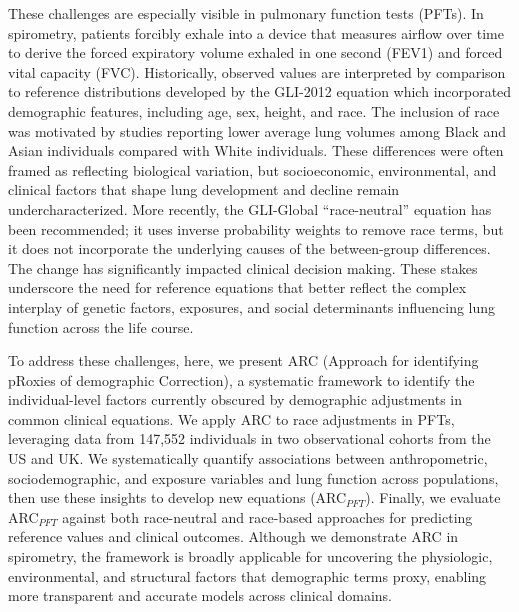 \documentclass[10pt]{extarticle}
\begin{document}
These challenges are especially visible in pulmonary function tests (PFTs). In spirometry, patients forcibly exhale into a device that measures airflow over time to derive the forced expiratory volume exhaled in one second (FEV1) and forced vital capacity (FVC). Historically, observed values are interpreted by comparison to reference distributions developed by the GLI-2012 equation which incorporated demographic features, including age, sex, height, and race\cite{Hankinson1999-qt,Quanjer2012-qw,Pellegrino2005-pq,Baugh2022-fs,Kanj2024-te,Choi2025-cl}. The inclusion of race was motivated by studies reporting lower average lung volumes among Black and Asian individuals compared with White individuals\cite{Hankinson1999-qt,Quanjer2012-qw,Kanj2024-te}. These differences were often framed as reflecting biological variation, but socioeconomic, environmental, and clinical factors that shape lung development and decline remain undercharacterized. More recently, the GLI-Global ``race-neutral'' equation has been recommended; it uses inverse probability weights to remove race terms, but it does not incorporate the underlying causes of the between-group differences\cite{Kanj2024-te,Choi2025-cl,Bowerman2023-ff,Moffett2023-eq}. The change has significantly impacted clinical decision making\cite{Diao2024-lw,Choi2025-cl,Moffett2023-eq}. These stakes underscore the need for reference equations that better reflect the complex interplay of genetic factors, exposures, and social determinants influencing lung function across the life course\cite{Menezes2015-ea,Holland2022-nt,Harik-Khan2001-bp,Whitrow2008-hm,He2023-bz,Manrai2017-fp,Patel2015-kc,Melen2024-ak,Lange2015-gb}.

To address these challenges, here, we present ARC (Approach for identifying pRoxies of demographic Correction), a systematic framework to identify the individual-level factors currently obscured by demographic adjustments in common clinical equations. We apply ARC to race adjustments in PFTs, leveraging data from 147,552 individuals in two observational cohorts from the US and UK. We systematically quantify associations between anthropometric, sociodemographic, and exposure variables and lung function across populations, then use these insights to develop new equations (ARC$_{PFT}$). Finally, we evaluate ARC$_{PFT}$ against both race-neutral and race-based approaches for predicting reference values and clinical outcomes. Although we demonstrate ARC in spirometry, the framework is broadly applicable for uncovering the physiologic, environmental, and structural factors that demographic terms proxy, enabling more transparent and accurate models across clinical domains.
\end{document}
